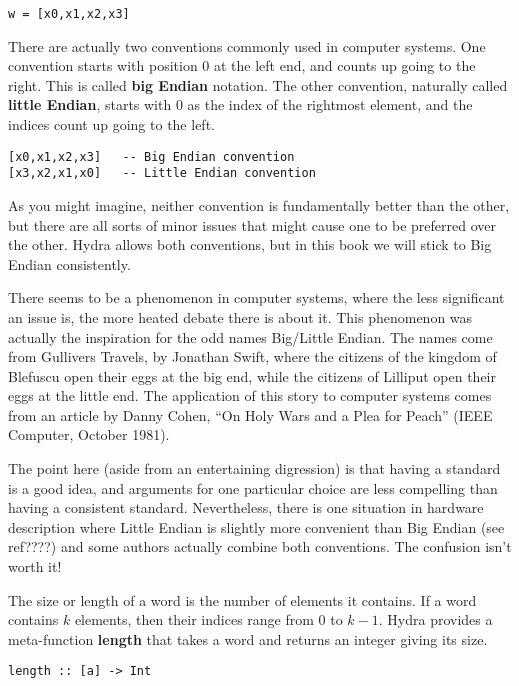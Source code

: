 \documentclass[11pt]{article}
\begin{document}
\begin{verbatim}
w = [x0,x1,x2,x3]
\end{verbatim}


There are actually two conventions commonly used in computer systems.
One convention starts with position 0 at the left end, and counts up
going to the right.  This is called \textbf{big Endian} notation.  The
other convention, naturally called \textbf{little Endian}, starts with 0
as the index of the rightmost element, and the indices count up going
to the left.

\begin{verbatim}
[x0,x1,x2,x3]   -- Big Endian convention
[x3,x2,x1,x0]   -- Little Endian convention
\end{verbatim}


As you might imagine, neither convention is fundamentally better than
the other, but there are all sorts of minor issues that might cause
one to be preferred over the other.  Hydra allows both conventions,
but in this book we will stick to Big Endian consistently.

There seems to be a phenomenon in computer systems, where the less
significant an issue is, the more heated debate there is about it.
This phenomenon was actually the inspiration for the odd names
Big/Little Endian.  The names come from Gullivers Travels, by Jonathan
Swift, where the citizens of the kingdom of Blefuscu open their eggs
at the big end, while the citizens of Lilliput open their eggs at the
little end.  The application of this story to computer systems comes
from an article by Danny Cohen, ``On Holy Wars and a Plea for Peach''
(IEEE Computer, October 1981).

The point here (aside from an entertaining digression) is that having
a standard is a good idea, and arguments for one particular choice are
less compelling than having a consistent standard.  Nevertheless,
there is one situation in hardware description where Little Endian is
slightly more convenient than Big Endian (see ref????) and some
authors actually combine both conventions.  The confusion isn't worth
it!

The size or length of a word is the number of elements it contains.
If a word contains \(k\) elements, then their indices range from 0 to
\(k-1\).  Hydra provides a meta-function \textbf{length} that takes a word and
returns an integer giving its size.


\begin{verbatim}
length :: [a] -> Int
\end{verbatim}
\end{document}
